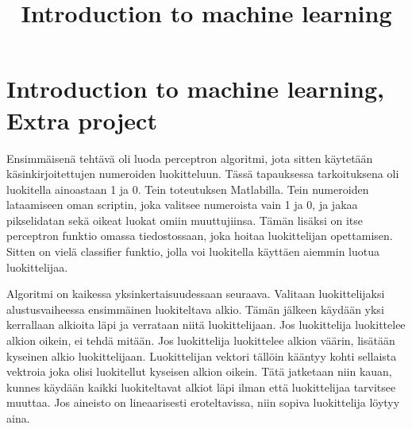 \documentclass[a4paper,10pt]{article}
\title{Introduction to machine learning}
\author{}
\date{}
\begin{document}
\section {Introduction to machine learning, Extra project}

Ensimmäisenä tehtävä oli luoda perceptron algoritmi, jota sitten käytetään käsinkirjoitettujen numeroiden luokitteluun. Tässä tapauksessa tarkoituksena
oli luokitella ainoastaan 1 ja 0. Tein toteutuksen Matlabilla. Tein numeroiden lataamiseen oman scriptin, joka valitsee numeroista vain 1 ja 0, 
ja jakaa pikselidatan sekä oikeat luokat omiin muuttujiinsa. Tämän lisäksi on itse perceptron funktio omassa tiedostossaan, joka hoitaa luokittelijan
opettamisen. Sitten on vielä classifier funktio, jolla voi luokitella käyttäen aiemmin luotua luokittelijaa. 

Algoritmi on kaikessa yksinkertaisuudessaan seuraava. Valitaan luokittelijaksi alustusvaiheessa ensimmäinen luokiteltava alkio. Tämän jälkeen käydään yksi
kerrallaan alkioita läpi ja verrataan niitä luokittelijaan. Jos luokittelija luokittelee alkion oikein, ei tehdä mitään. Jos luokittelija luokittelee
alkion väärin, lisätään kyseinen alkio luokittelijaan. Luokittelijan vektori tällöin kääntyy kohti sellaista vektroia joka olisi luokitellut kyseisen alkion oikein.
Tätä jatketaan niin kauan, kunnes käydään kaikki luokiteltavat alkiot läpi ilman että luokittelijaa tarvitsee muuttaa. Jos aineisto on lineaarisesti eroteltavissa, niin
sopiva luokittelija löytyy aina. 
\end{document}
